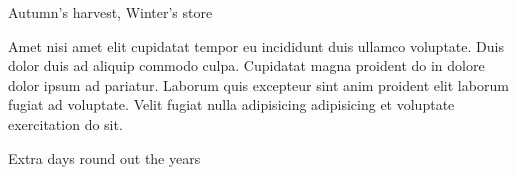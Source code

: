 {\mktsHOne{}\cjkgGlue{} Autumn’s harvest, Winter’s store\mktsHOneBeg}%


\vspace{\myLineheight}\begin{multicols}{2}\raggedcolumns{}Amet nisi amet elit cupidatat tempor eu incididunt duis ullamco voluptate. Duis dolor duis ad aliquip commodo culpa. Cupidatat magna proident do in dolore dolor ipsum ad pariatur. Laborum quis excepteur sint anim proident elit laborum fugiat ad voluptate. Velit fugiat nulla adipisicing adipisicing et voluptate exercitation do sit.



\end{multicols}


{\mktsHTwo{}\cjkgGlue{} Extra days round out the years\mktsHTwoBeg}%


